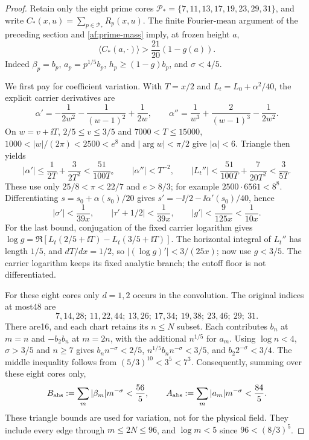 \begin{proof}
Retain only the eight prime cores
$\mathcal P_*=\{7,11,13,17,19,23,29,31\}$, and write
$C_*(x,u)=\sum_{p\in\mathcal P_*}R_p(x,u)$.
The finite Fourier-mean argument of the preceding section and
\eqref{af:prime-mass} imply, at frozen height $a$,
\begin{equation}
 \langle C_*(a,\cdot)\rangle>
                  \frac{21}{20}(1-g(a)).
 \label{ap:mean}
\end{equation}
Indeed $\beta_p=b_p$, $a_p=p^{1/5}b_p$,
$h_p\ge(1-g)b_p$, and $\sigma<4/5$.

We first pay for coefficient variation. With $T=x/2$ and
$L_t=L_0+\alpha^2/40$, the explicit carrier derivatives are
\[
 \alpha'=-\frac1{2w^2}-\frac1{(w-1)^2}+\frac1{2w},\qquad
 \alpha''=\frac1{w^3}+\frac2{(w-1)^3}-\frac1{2w^2}.
\]
On $w=v+\ii T$, $2/5\le v\le3/5$ and $7000<T\le15000$,
$1000<|w|/(2\pi)<2500<e^8$ and $|\arg w|<\pi/2$ give
$|\alpha|<6$. Triangle then yields
\[
 |\alpha'|\le\frac1{2T}+\frac3{2T^2}
       <\frac{51}{100T},\qquad
 |\alpha''|<T^{-2},\qquad
 |L_t''|<\frac{51}{100T}+\frac7{20T^2}<\frac3{5T}.
\]
These use only $25/8<\pi<22/7$ and $e>8/3$; for example
$2500\cdot6561<8^8$.
Differentiating $s=s_0+\alpha(s_0)/20$ gives
$s'=-\ii/2-\ii\alpha'(s_0)/40$, hence
\begin{equation}
 |\sigma'|<\frac1{39x},\qquad
 |\tau'+1/2|<\frac1{39x},\qquad
 |g'|<\frac9{125x}<\frac1{10x}.
 \label{ap:velocities}
\end{equation}
For the last bound, conjugation of the fixed carrier logarithm gives
$\log g=\Re[L_t(2/5+\ii T)-L_t(3/5+\ii T)]$.
The horizontal integral of $L_t''$ has length $1/5$, and $dT/dx=1/2$,
so $|(\log g)'|<3/(25x)$; now use $g<3/5$.
The carrier logarithm keeps its fixed analytic branch; the cutoff
floor is not differentiated.

For these eight cores only $d=1,2$ occurs in the convolution.
The original indices at most48 are
\[
 7,14,28;\ 11,22,44;\ 13,26;\ 17,34;\
 19,38;\ 23,46;\ 29;\ 31.
\]
There are16, and each chart retains its $n\le N$ subset.
Each contributes $b_n$ at $m=n$ and $-b_2b_n$ at $m=2n$,
with the additional $n^{1/5}$ for $a_m$.
Using $\log n<4$, $\sigma>3/5$ and $n\ge7$ gives
$b_n n^{-\sigma}<2/5$,
$n^{1/5}b_n n^{-\sigma}<3/5$, and
$b_2 2^{-\sigma}<3/4$. The middle inequality follows from
$(5/3)^{10}<3^5<7^3$.
Consequently, summing over these eight cores only,
\begin{equation}
 B_{\rm abs}:=\sum_m|\beta_m|m^{-\sigma}<\frac{56}{5},
 \qquad
 A_{\rm abs}:=\sum_m|a_m|m^{-\sigma}<\frac{84}{5}.
 \label{ap:mass}
\end{equation}
These triangle bounds are used for variation, not for the physical
field. They include every edge through $m\le2N\le96$, and
$\log m<5$ since $96<(8/3)^5$.


\end{proof}
